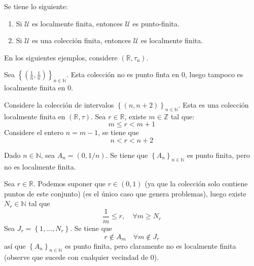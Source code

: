 \documentclass[12pt]{report}
\theoremstyle{largebreak}
\begin{document}
    \begin{obs}
        Se tiene lo siguiente:
        \begin{enumerate}
            \item Si $\mathcal{U}$ es localmente finita, entonces $\mathcal{U}$ es punto-finita.
            \item Si $\mathcal{U}$ es una colección finita, entonces $\mathcal{U}$ es localmente finita.
        \end{enumerate}
    \end{obs}

    En los siguientes ejemplos, considere $(\mathbb{R},\tau_u)$.
    
    \begin{exa}
        Sea $\left\{\left(\frac{1}{n},\frac{1}{n}\right) \right\}_{ n\in\mathbb{N}}$. Esta colección no es punto finta en $0$, luego tampoco es localmente finita en $0$.
    \end{exa}

    \begin{exa}
        Considere la colección de intervalos $\left\{\left(n,n+2\right) \right\}_{ n\in\mathbb{N}}$. Esta es una colección localmente finita en $(\mathbb{R},\tau)$. Sea $r\in\mathbb{R}$, existe $m\in\mathbb{Z}$ tal que:
        \begin{equation*}
            m\leq r<m+1
        \end{equation*}
        Considere el entero $n=m-1$, se tiene que
        \begin{equation*}
            n<r<n+2
        \end{equation*}
    \end{exa}

    \begin{exa}
        Dado $n\in\mathbb{N}$, sea $A_n=(0,1/n)$. Se tiene que $\left\{A_n \right\}_{ n\in\mathbb{N}}$ es punto finita, pero no es localmente finita.

        Sea $r\in\mathbb{R}$. Podemos suponer que $r\in(0,1)$ (ya que la colección solo contiene puntos de este conjunto) (es el único caso que genera problemas), luego existe $N_r\in\mathbb{N}$ tal que
        \begin{equation*}
            \frac{1}{m}\leq r,\quad\forall m\geq N_r
        \end{equation*}
        Sea $J_r=\left\{1,...,N_r \right\}$. Se tiene que
        \begin{equation*}
            r\notin A_m\quad\forall m\notin J_r
        \end{equation*}
        así que $\left\{A_n \right\}_{ n\in\mathbb{N}}$ es punto finita, pero claramente no es localmente finita (observe que sucede con cualquier vecindad de $0$).
    \end{exa}
\end{document}
